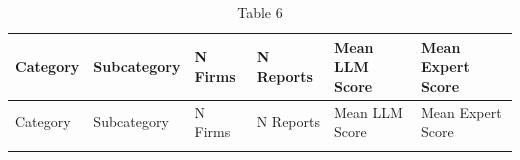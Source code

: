 \documentclass[
  12pt,
]{article}
\begin{document}
\begin{longtable}[]{@{}
  >{\raggedright\arraybackslash}p{}
  >{\raggedright\arraybackslash}p{}
  >{\raggedleft\arraybackslash}p{}
  >{\raggedleft\arraybackslash}p{}
  >{\raggedleft\arraybackslash}p{}
  >{\raggedleft\arraybackslash}p{}@{}}
\caption{Table 6}\label{tbl-robustness}\tabularnewline
\toprule\noalign{}
\begin{minipage}[b]{\linewidth}\raggedright
Category
\end{minipage} & \begin{minipage}[b]{\linewidth}\raggedright
Subcategory
\end{minipage} & \begin{minipage}[b]{\linewidth}\raggedleft
N Firms
\end{minipage} & \begin{minipage}[b]{\linewidth}\raggedleft
N Reports
\end{minipage} & \begin{minipage}[b]{\linewidth}\raggedleft
Mean LLM Score
\end{minipage} & \begin{minipage}[b]{\linewidth}\raggedleft
Mean Expert Score
\end{minipage} \\
\midrule\noalign{}
\endfirsthead
\toprule\noalign{}
\begin{minipage}[b]{\linewidth}\raggedright
Category
\end{minipage} & \begin{minipage}[b]{\linewidth}\raggedright
Subcategory
\end{minipage} & \begin{minipage}[b]{\linewidth}\raggedleft
N Firms
\end{minipage} & \begin{minipage}[b]{\linewidth}\raggedleft
N Reports
\end{minipage} & \begin{minipage}[b]{\linewidth}\raggedleft
Mean LLM Score
\end{minipage} & \begin{minipage}[b]{\linewidth}\raggedleft
Mean Expert Score
\end{minipage} \\
\midrule\noalign{}
\endhead

\end{longtable}
\end{document}
